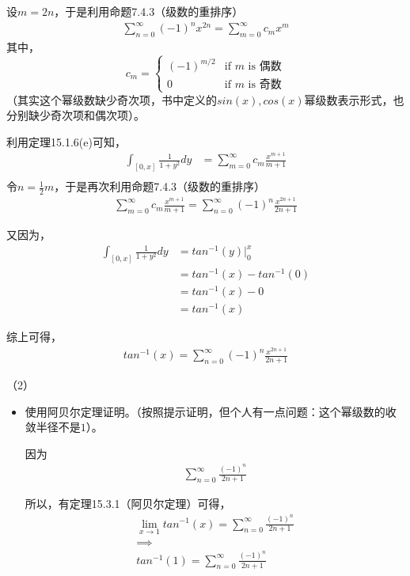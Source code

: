 \documentclass{article}
\begin{document}
设$m = 2n$，于是利用命题7.4.3（级数的重排序）
\begin{align*}
  \sum \limits_{n = 0}^{\infty} (-1)^n x^{2n}
  =
  \sum \limits_{m = 0}^{\infty} c_m x^{m}
\end{align*}
其中，
\begin{equation*}
  c_m = \begin{cases}
    (-1)^{m/2} & \text{if } m \text{ is 偶数} \\
    0          & \text{if } m \text{ is 奇数}
  \end{cases}
\end{equation*}
（其实这个幂级数缺少奇次项，书中定义的$sin(x), cos(x)$幂级数表示形式，也分别缺少奇次项和偶次项）。

利用定理15.1.6(e)可知，
\begin{align*}
  \int_{[0, x]} \frac{1}{1 + y^2} dy
   & = \sum \limits_{m = 0}^{\infty} c_m \frac{x^{m + 1}}{m + 1} \\
\end{align*}
令$n = \frac{1}{2}m$，于是再次利用命题7.4.3（级数的重排序）
\begin{align*}
  \sum \limits_{m = 0}^{\infty} c_m \frac{x^{m + 1}}{m + 1}
  =
  \sum \limits_{n = 0}^{\infty} (-1)^n \frac{x^{2n + 1}}{2n + 1}
\end{align*}

又因为，
\begin{align*}
  \int_{[0, x]} \frac{1}{1 + y^2} dy
   & = tan^{-1}(y)|_0^x          \\
   & = tan^{-1}(x) - tan^{-1}(0) \\
   & = tan^{-1}(x) - 0           \\
   & = tan^{-1}(x)
\end{align*}

综上可得，
\begin{align*}
  tan^{-1}(x) = \sum \limits_{n = 0}^{\infty} (-1)^n \frac{x^{2n + 1}}{2n + 1}
\end{align*}

（2）

\begin{itemize}
  \item 使用阿贝尔定理证明。（按照提示证明，但个人有一点问题：这个幂级数的收敛半径不是$1$）。

        因为
        \begin{align*}
          \sum \limits_{n = 0}^{\infty} \frac{(-1)^n}{2n + 1}
        \end{align*}

        所以，有定理15.3.1（阿贝尔定理）可得，
        \begin{align*}
          \lim\limits_{x \to 1} tan^{-1}(x) = \sum \limits_{n = 0}^{\infty} \frac{(-1)^n}{2n + 1} \\
          \implies                                                                                \\
          tan^{-1} (1) = \sum \limits_{n = 0}^{\infty} \frac{(-1)^n}{2n + 1}
        \end{align*}
\end{itemize}
\end{document}
